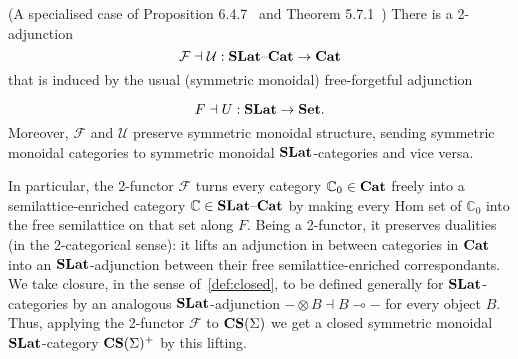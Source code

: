 \begin{proposition}(A specialised case of Proposition 6.4.7~\cite{Borceux_1994} and Theorem 5.7.1~\cite{cruttwell2008normed})
	There is a 2-adjunction
	\vspace{-1mm}
	\[
		\mathcal{F} \dashv \mathcal{U} : \catname{SLat}\text{--}\catname{Cat} \to \catname{Cat}
		\vspace{-1mm}
	\]
	that is induced by the usual (symmetric monoidal) free-forgetful adjunction

	\vspace{-1mm}
	\[
		F \dashv U : \catname{SLat} \to \catname{Set}.
		\vspace{-1mm}
	\]
	Moreover, $\mathcal{F}$ and $\mathcal{U}$ preserve symmetric monoidal structure, sending symmetric monoidal categories to symmetric monoidal $\mathbf{SLat}$-categories and vice versa.
\end{proposition}
In particular, the 2-functor $\mathcal{F}$ turns every category $\mathbb{C}_0 \in \mathbf{Cat}$ freely into a semilattice-enriched category $\mathbb{C} \in \mathbf{SLat}\text{--}\mathbf{Cat}$ by making every Hom set of $\mathbb{C}_0$ into the free semilattice on that set along $F$.
Being a 2-functor, it preserves dualities (in the 2-categorical sense): it lifts an adjunction in between categories in $\mathbf{Cat}$ into an $\mathbf{SLat}$-adjunction between their free semilattice-enriched correspondants.
We take closure, in the sense of~\autoref{def:closed}, to be defined generally for $\mathbf{SLat}$-categories by an analogous $\mathbf{SLat}$-adjunction $- \otimes B \dashv B \multimap -$ for every object $B$.
Thus, applying the 2-functor $\mathcal{F}$ to $\mathbf{CS}(\Sigma)$ we get a closed symmetric monoidal $\mathbf{SLat}$-category $\mathbf{CS}(\Sigma)^{+}$ by this lifting.
